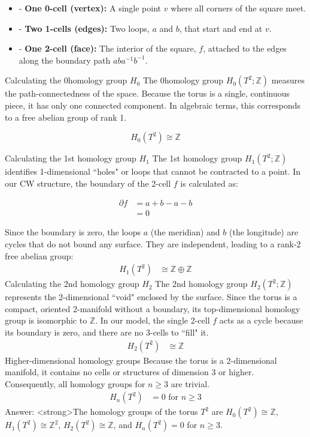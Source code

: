 \documentclass[12pt,a4paper]{report}
\begin{document}
\begin{description}
\begin{itemize}
\item - \textbf{One 0-cell (vertex):} A single point $v$ where all corners of the square meet.
\item - \textbf{Two 1-cells (edges):} Two loops, $a$ and $b$, that start and end at $v$.
\item - \textbf{One 2-cell (face):} The interior of the square, $f$, attached to the edges along the boundary path $aba^{-1}b^{-1}$.
\end{itemize}

Calculating the 0\ITH homology group $H_0$
The 0\ITH homology group $H_0(T^2; \mathbb{Z})$ measures the path-connectedness of the space. Because the torus is a single, continuous piece, it has only one connected component. In algebraic terms, this corresponds to a free abelian group of rank 1.

$$H_0(T^2) \cong \mathbb{Z}$$

Calculating the 1st homology group $H_1$
The 1st homology group $H_1(T^2; \mathbb{Z})$ identifies 1-dimensional ``holes" or loops that cannot be contracted to a point. In our CW structure, the boundary of the 2-cell $f$ is calculated as:

\begin{align*}
\partial f & = a + b - a - b \\
& = 0
\end{align*}

Since the boundary is zero, the loops $a$ (the meridian) and $b$ (the longitude) are cycles that do not bound any surface. They are independent, leading to a rank-2 free abelian group:
\begin{align*}
H_1(T^2) & \cong \mathbb{Z} \oplus \mathbb{Z}
\end{align*}
Calculating the 2nd homology group $H_2$
The 2nd homology group $H_2(T^2; \mathbb{Z})$ represents the 2-dimensional ``void" enclosed by the surface. Since the torus is a compact, oriented 2-manifold without a boundary, its top-dimensional homology group is isomorphic to $\mathbb{Z}$. In our model, the single 2-cell $f$ acts as a cycle because its boundary is zero, and there are no 3-cells to ``fill" it.
\begin{align*}
H_2(T^2) & \cong \mathbb{Z}
\end{align*}
Higher-dimensional homology groups
Because the torus is a 2-dimensional manifold, it contains no cells or structures of dimension 3 or higher. Consequently, all homology groups for $n \geq 3$ are trivial.
\begin{align*}
H_n(T^2) & = 0 \text{ for } n \geq 3
\end{align*}
Answer: <strong>The homology groups of the torus $T^2$ are $H_0(T^2) \cong \mathbb{Z}$, $H_1(T^2) \cong \mathbb{Z}^2$, $H_2(T^2) \cong \mathbb{Z}$, and $H_n(T^2) = 0$ for $n \geq 3$.


\end{description}
\end{document}
